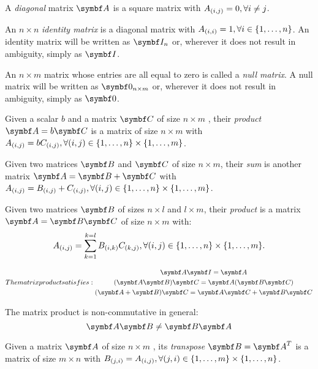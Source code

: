 A \emph{diagonal} matrix $\mat{A}$ is a square matrix with $A_{(i,j)}=0, \forall i\ne j$.

An $n \times n$ \emph{identity matrix} is a diagonal matrix with $A_{(i,i)}=1, \forall i \in \{1,\dotsc,n\}$. An identity matrix will be written as $\IdM_{n}$ or, wherever it does not result in ambiguity, simply as $\IdM$.

An $n \times m$ matrix whose entries are all equal to zero is called a \emph{null matrix}. A null matrix will be written as $\NullM_{n \times m}$ or, wherever it does not result in ambiguity, simply as $\NullM$.

Given a scalar $b$ and a matrix $\mat{C}$ of size $n\times m$ , their \emph{product} $\mat{A}=b\mat{C}$ is a matrix of size $n \times m$ with $A_{(i,j)}=bC_{(i,j)}, \forall (i,j)\in\{1,\dotsc,n\} \times \{1,\dotsc,m\}$.

Given two matrices $\mat{B}$ and $\mat{C}$ of size $n \times m$, their \emph{sum} is another matrix $\mat{A}=\mat{B}+\mat{C}$ with $A_{(i,j)}=B_{(i,j)}+C_{(i,j)}, \forall (i,j)\in\{1,\dotsc,n\} \times \{1,\dotsc,m\}$.

Given two matrices $\mat{B}$ of sizes $n \times l$ and $l \times m$, their \emph{product} is a matrix $\mat{A}=\mat{B}\mat{C}$ of size $n \times m$ with:
\begin{equation*}
A_{(i,j)}=\sum_{k=1}^{k=l}B_{(i,k)}C_{(k,j)}, \forall (i,j)\in\{1,\dotsc,n\} \times \{1,\dotsc,m\}.
\end{equation*}

\begin{subequations}
The matrix product satisfies:
\begin{gather}
\mat{A}\IdM = \mat{A} \label{Eq.Res.MatProdIdent} \\
(\mat{A}\mat{B})\mat{C} = \mat{A}(\mat{B}\mat{C}) \label{Eq.Res.MatProdAssoc} \\
(\mat{A}+\mat{B})\mat{C} = \mat{A}\mat{C} + \mat{B}\mat{C} \label{Eq.Res.MatProdDist}
\end{gather}
\end{subequations}

The matrix product is non-commutative in general:
\begin{equation*}
	\mat{A}\mat{B} \ne \mat{B}\mat{A}
\end{equation*}

Given a matrix $\mat{A}$ of size $n\times m$ , its \emph{transpose} $\mat{B}=\tr{\mat{A}}$ is a matrix of size $m \times n$ with $B_{(j,i)}=A_{(i,j)}, \forall (j,i)\in\{1,\dotsc,m\} \times \{1,\dotsc,n\}$.

